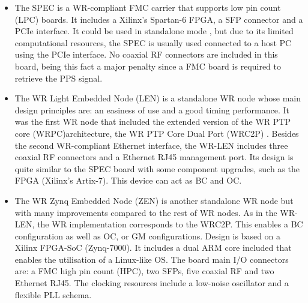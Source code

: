 \begin{itemize} 
	\item The SPEC \cite{ohwr:spec} is a WR-compliant FMC carrier that supports low pin count (LPC) boards. It includes a Xilinx's Spartan-6 FPGA, a SFP connector and a PCIe interface. It could be used in standalone mode \cite{migueljl-paper-wr-spec}, but due to its limited computational resources, the SPEC is usually used connected to a host PC using the PCIe interface.  No coaxial RF connectors are included in this board, being this fact a major penalty since a FMC board is required to retrieve the PPS signal.
	
	\item The WR Light Embedded Node (LEN) \cite{sevensols:wr_len} is a 	standalone WR node whose main design principles are: an easiness of use and a good timing performance. It was the first WR node	that included the extended version of the WR PTP core (WRPC)architecture, the WR PTP Core Dual Port (WRC2P) \cite{torres2016scalability}. Besides the second WR-compliant Ethernet interface, the WR-LEN includes three coaxial RF
	connectors and a Ethernet RJ45 management port. Its design is quite similar to the SPEC board with some component upgrades, such as the FPGA (Xilinx's Artix-7). This device can act as BC and OC.
	
	\item The WR Zynq Embedded Node (ZEN) \cite{sevensols:wr_zen} is another
	standalone WR node but with many improvements compared to the rest of WR nodes. As in the WR-LEN, the WR implementation corresponds to the WRC2P.  This enables a BC configuration as well as OC, or GM configurations. Design is based on a Xilinx FPGA-SoC (Zynq-7000). It includes a dual ARM core included that enables the utilisation of a Linux-like	OS. The board main I/O connectors are: a FMC high pin count (HPC), two SFPs, five coaxial RF and two Ethernet RJ45. The clocking resources include a low-noise oscillator and a flexible PLL schema.
\end{itemize}


